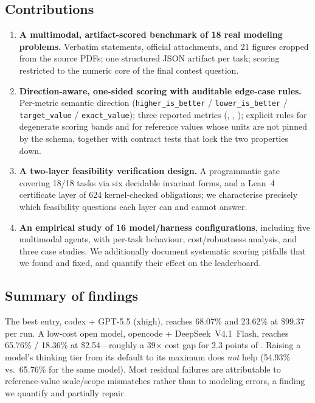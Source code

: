 \subsection{Contributions}
\begin{enumerate}[leftmargin=1.4em,itemsep=2pt]
\item \textbf{A multimodal, artifact-scored benchmark of 18 real modeling problems.} Verbatim statements, official attachments, and 21 figures cropped from the source PDFs; one structured JSON artifact per task; scoring restricted to the numeric core of the final contest question.
\item \textbf{Direction-aware, one-sided scoring with auditable edge-case rules.} Per-metric semantic direction (\texttt{higher\_is\_better} / \texttt{lower\_is\_better} / \texttt{target\_value} / \texttt{exact\_value}); three reported metrics (\oeval{}, \beval{}, \roeval{}); explicit rules for degenerate scoring bands and for reference values whose units are not pinned by the schema, together with contract tests that lock the two properties down.
\item \textbf{A two-layer feasibility verification design.} A programmatic gate covering 18/18 tasks via six decidable invariant forms, and a Lean~4 certificate layer of 624 kernel-checked obligations; we characterise precisely which feasibility questions each layer can and cannot answer.
\item \textbf{An empirical study of 16 model/harness configurations}, including five multimodal agents, with per-task behaviour, cost/robustness analysis, and three case studies. We additionally document systematic scoring pitfalls that we found and fixed, and quantify their effect on the leaderboard.
\end{enumerate}

\subsection{Summary of findings}
The best entry, codex + GPT-5.5 (xhigh), reaches \oeval{} 68.07\% and \roeval{} 23.62\% at \$99.37 per run. A low-cost open model, opencode + DeepSeek~V4.1~Flash, reaches 65.76\% / 18.36\% at \$2.54---roughly a 39$\times$ cost gap for 2.3 points of \oeval{}. Raising a model's thinking tier from its default to its maximum does \emph{not} help (54.93\% vs.\ 65.76\% for the same model). Most residual failures are attributable to reference-value scale/scope mismatches rather than to modeling errors, a finding we quantify and partially repair.
